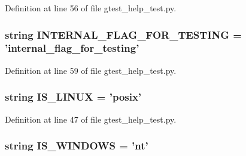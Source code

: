 \-Definition at line 56 of file gtest\-\_\-help\-\_\-test.\-py.

\hypertarget{namespacegtest__help__test_aa7684642afd3a6cfd9062ebb2c43a10e}{
\subsubsection[{\-I\-N\-T\-E\-R\-N\-A\-L\-\_\-\-F\-L\-A\-G\-\_\-\-F\-O\-R\-\_\-\-T\-E\-S\-T\-I\-N\-G}]{\setlength{\rightskip}{0pt plus 5cm}string {\bf \-I\-N\-T\-E\-R\-N\-A\-L\-\_\-\-F\-L\-A\-G\-\_\-\-F\-O\-R\-\_\-\-T\-E\-S\-T\-I\-N\-G} = 'internal\-\_\-flag\-\_\-for\-\_\-testing'}}\label{de/dbf/namespacegtest__help__test_aa7684642afd3a6cfd9062ebb2c43a10e}


\-Definition at line 59 of file gtest\-\_\-help\-\_\-test.\-py.

\hypertarget{namespacegtest__help__test_a90c275a505433b6e9dc2e404ee55395e}{
\subsubsection[{\-I\-S\-\_\-\-L\-I\-N\-U\-X}]{\setlength{\rightskip}{0pt plus 5cm}string {\bf \-I\-S\-\_\-\-L\-I\-N\-U\-X} = 'posix'}}\label{de/dbf/namespacegtest__help__test_a90c275a505433b6e9dc2e404ee55395e}


\-Definition at line 47 of file gtest\-\_\-help\-\_\-test.\-py.

\hypertarget{namespacegtest__help__test_ab1b21b880253abfa3ab3dfc19b06814c}{
\subsubsection[{\-I\-S\-\_\-\-W\-I\-N\-D\-O\-W\-S}]{\setlength{\rightskip}{0pt plus 5cm}string {\bf \-I\-S\-\_\-\-W\-I\-N\-D\-O\-W\-S} = 'nt'}}\label{de/dbf/namespacegtest__help__test_ab1b21b880253abfa3ab3dfc19b06814c}


